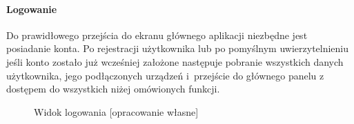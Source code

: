 \documentclass[polish,bachelor,a4paper,oneside]{ppfcmthesis}
\begin{document}
    \paragraph{Logowanie}
    Do prawidłowego przejścia do ekranu głównego aplikacji niezbędne jest posiadanie konta. Po rejestracji użytkownika lub po pomyślnym uwierzytelnieniu jeśli konto zostało już wcześniej założone następuje pobranie wszystkich danych użytkownika, jego podłączonych urządzeń i~przejście do głównego panelu z dostępem do wszystkich niżej omówionych funkcji.
    \nopagebreak
    \begin{figure}[H]
        \centering
        \hfill
        \hfill
        \caption{Widok logowania [opracowanie własne]}
        \label{fig:logowanie}
    \end{figure}
\end{document}
